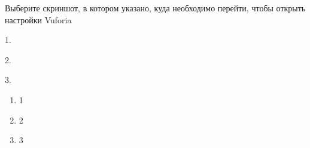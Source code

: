 
Выберите скриншот, в котором указано, куда необходимо перейти, чтобы открыть настройки Vuforia

1.


2.


3.


\begin{enumerate}
    \item 1
    \item 2
    \item 3
\end{enumerate}